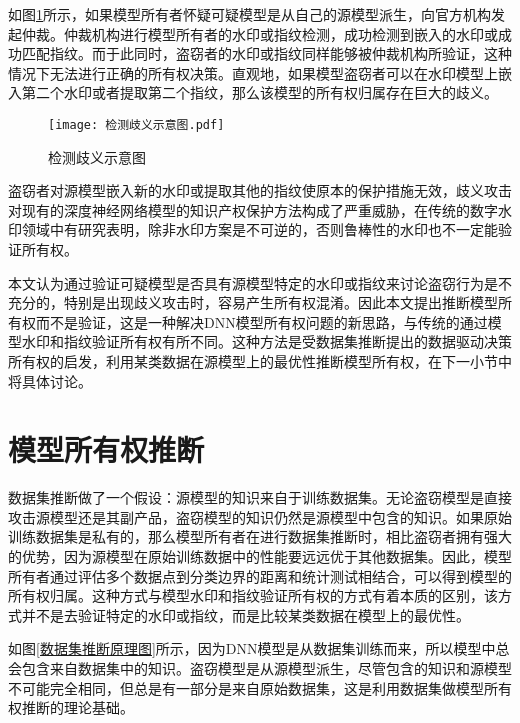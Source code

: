如图\ref{检测歧义示意图}所示，如果模型所有者怀疑可疑模型是从自己的源模型派生，向官方机构发起仲裁。仲裁机构进行模型所有者的水印或指纹检测，成功检测到嵌入的水印或成功匹配指纹。而于此同时，盗窃者的水印或指纹同样能够被仲裁机构所验证，这种情况下无法进行正确的所有权决策。直观地，如果模型盗窃者可以在水印模型上嵌入第二个水印或者提取第二个指纹，那么该模型的所有权归属存在巨大的歧义。

\begin{figure}[htb]%
	\centering
	\setlength{\abovecaptionskip}{3mm} %
	\setlength{\belowcaptionskip}{-3mm} %
	\texttt{[image: 检测歧义示意图.pdf]}
	\caption{检测歧义示意图}
	\label{检测歧义示意图}
\end {figure}

盗窃者对源模型嵌入新的水印或提取其他的指纹使原本的保护措施无效，歧义攻击对现有的深度神经网络模型的知识产权保护方法构成了严重威胁，在传统的数字水印领域中有研究表明，除非水印方案是不可逆的\cite{fan2019rethinking}，否则鲁棒性的水印也不一定能验证所有权。

本文认为通过验证可疑模型是否具有源模型特定的水印或指纹来讨论盗窃行为是不充分的，特别是出现歧义攻击时，容易产生所有权混淆。因此本文提出推断模型所有权而不是验证，这是一种解决DNN模型所有权问题的新思路，与传统的通过模型水印和指纹验证所有权有所不同。这种方法是受数据集推断\cite{maini2021dataset}提出的数据驱动决策所有权的启发，利用某类数据在源模型上的最优性推断模型所有权，在下一小节中将具体讨论。


\section{模型所有权推断}\label{3.2}

数据集推断做了一个假设：源模型的知识来自于训练数据集。无论盗窃模型是直接攻击源模型还是其副产品，盗窃模型的知识仍然是源模型中包含的知识。如果原始训练数据集是私有的，那么模型所有者在进行数据集推断时，相比盗窃者拥有强大的优势，因为源模型在原始训练数据中的性能要远远优于其他数据集。因此，模型所有者通过评估多个数据点到分类边界的距离和统计测试相结合，可以得到模型的所有权归属。这种方式与模型水印和指纹验证所有权的方式有着本质的区别，该方式并不是去验证特定的水印或指纹，而是比较某类数据在模型上的最优性。

如图\ref{数据集推断原理图}所示，因为DNN模型是从数据集训练而来，所以模型中总会包含来自数据集中的知识。盗窃模型是从源模型派生，尽管包含的知识和源模型不可能完全相同，但总是有一部分是来自原始数据集，这是利用数据集做模型所有权推断的理论基础。

